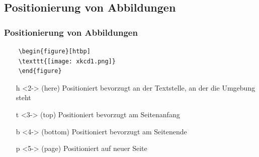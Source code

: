 \subsection{Positionierung von Abbildungen}
\begin{frame}[fragile]
\frametitle{Positionierung von Abbildungen}
  \begin{codeblock}
   \begin{verbatim}
    \begin{figure}[htbp]
    \texttt{[image: xkcd1.png]}
    \end{figure}
   \end{verbatim}
  \end{codeblock}
  
  \begin{itemize}
    \item[h]<2-> (here) Positioniert bevorzugt an der Textstelle, an der
die Umgebung steht
    \item[t]<3-> (top) Positioniert bevorzugt am Seitenanfang
    \item[b]<4-> (bottom) Positioniert bevorzugt am Seitenende
    \item[p]<5-> (page) Positioniert auf neuer Seite
  \end{itemize}
\end{frame}
